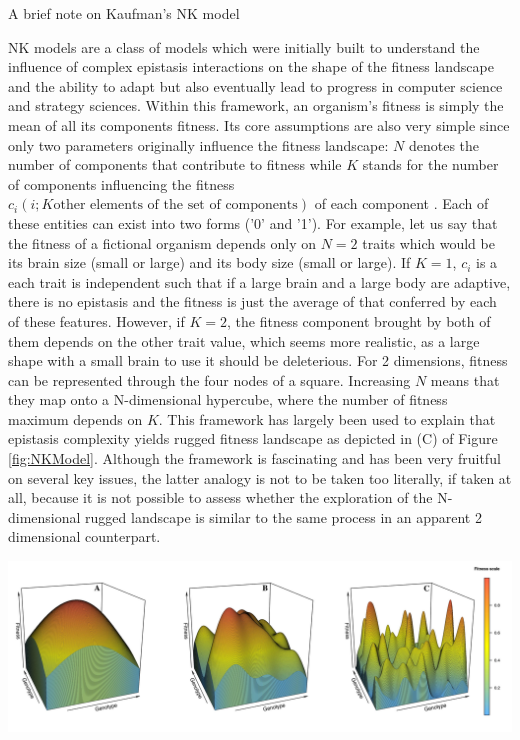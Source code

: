 \begin{mybox}{\begin{Note-box}
\label{Box-NKModel}A brief note on Kaufman's NK model\end{Note-box}}
\onehalfspacing
NK models are a class of models which were initially built to understand the influence of complex epistasis interactions on the shape of the fitness landscape and the ability to adapt \citep{Kauffman87} but also eventually lead to progress in computer science and strategy sciences. Within this framework, an organism's fitness is simply the mean of all its components fitness. Its core assumptions are also very simple since only two parameters originally influence the fitness landscape: $N$ denotes the number of components that contribute to fitness while $K$ stands for the number of components influencing the fitness $c_i(i; K \text{other elements of the set of components})$ of each component \citep{Csaszar18}. Each of these entities can exist into two forms ('0' and '1'). For example, let us say that the fitness of a fictional organism depends only on $N=2$ traits which would be its brain size (small or large) and its body size (small or large). If $K=1$, $c_i$ is a each trait is independent such that if a large brain and a large body are adaptive, there is no epistasis and the fitness is just the average of that conferred by each of these features. However, if $K=2$, the fitness component brought by both of them depends on the other trait value, which seems more realistic, as a large shape with a small brain to use it should be deleterious. For 2 dimensions, fitness can be represented through the four nodes of a square. Increasing $N$ means that they map onto a N-dimensional hypercube, where the number of fitness maximum depends on $K$. This framework has largely been used to explain that epistasis complexity yields rugged fitness landscape as depicted in (C) of Figure \ref{fig:NKModel}. Although the framework is fascinating and has been very fruitful on several key issues, the latter analogy is not to be taken too literally, if taken at all, because it is not possible to assess whether the exploration of the N-dimensional rugged landscape is similar to the same process in an apparent 2 dimensional counterpart.
\begin{center}
    \includegraphics[scale=0.455,trim=0cm 0cm 0cm 0cm,clip]{pics/Epistasis/RuggedLandscapes.jpeg}

\end{center}
\end{mybox}
